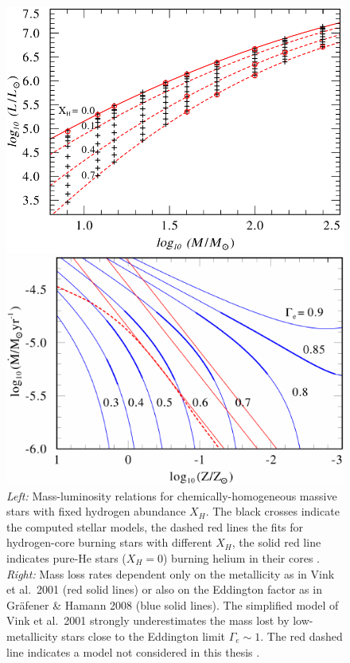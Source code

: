 \documentclass[a4paper,titlepage]{book}     	%
\begin{document}
 
\begin{figure}[h]
	\begin{minipage}{.49\textwidth}
		\centering
		\includegraphics[width=.94\textwidth]{./images/MLrelation.png}
	\end{minipage}
	\hfill
	\begin{minipage}{.49\textwidth}
		\centering
		\includegraphics[width=\textwidth]{./images/stellarwinds.pdf}	
	\end{minipage}
	\caption{\emph{Left:} Mass-luminosity relations for chemically-homogeneous massive stars with fixed hydrogen abundance $X_H$. The black crosses indicate the computed stellar models, the dashed red lines the fits for hydrogen-core burning stars with different $X_H$, the solid red line indicates pure-He stars ($X_H = 0$) burning helium in their cores \cite{Grafener2011_M-L_WR}. \emph{Right:} Mass loss rates dependent only on the metallicity as in Vink et al.\ 2001 \cite{Vink2001} (red solid lines) or also on the Eddington factor as in Gr{\"a}fener \& Hamann 2008 \cite{G&H_WRmassloss} (blue solid lines). The simplified model of Vink et al.\ 2001 strongly underestimates the mass lost by low-metallicity stars close to the Eddington limit $\Gamma_e \sim 1$. The red dashed line indicates a model not considered in this thesis \cite{G&H_WRmassloss}.}\label{fig:MLandwinds}
\end{figure}
\end{document}
